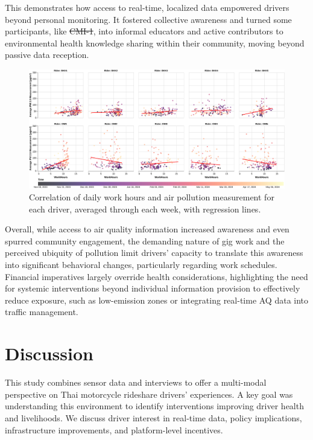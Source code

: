 \documentclass[sigconf,screen,natbib=true]{acmart}
\providecommand{\DIFadd}[1]{{\protect\color{blue}\uwave{#1}}} %
\providecommand{\DIFdel}[1]{{\protect\color{red}\sout{#1}}} %
\providecommand{\DIFaddbegin}{} %
\providecommand{\DIFaddend}{} %
\providecommand{\DIFdelbegin}{} %
\providecommand{\DIFdelend}{} %
\begin{document}
This demonstrates how access to real-time, localized data empowered drivers beyond personal monitoring.
It fostered collective awareness and turned some participants, like \DIFdelbegin \DIFdel{CMI-1}\DIFdelend \DIFaddbegin \DIFadd{CMI1}\DIFaddend , into informal educators and active contributors to environmental health knowledge sharing within their community, moving beyond passive data reception.

\begin{figure}
    \centering
    \includegraphics[width=\textwidth]{figures/work-hours-vs-aqi-per-rider-regression.pdf}
    \caption{Correlation of daily work hours and air pollution measurement for each driver, averaged through each week, with regression lines.
}
    \Description{}
    \label{fig:work-hours-vs-aqi-per-rider}
\end{figure}

Overall, while access to air quality information increased awareness and even spurred community engagement, the demanding nature of gig work and the perceived ubiquity of pollution limit drivers' capacity to translate this awareness into significant behavioral changes, particularly regarding work schedules.
Financial imperatives largely override health considerations, highlighting the need for systemic interventions beyond individual information provision to effectively reduce exposure, such as low-emission zones or integrating real-time AQ data into traffic management. %
 \section{Discussion}

This study combines sensor data and interviews to offer a multi-modal perspective on Thai motorcycle rideshare drivers' experiences.
A key goal was understanding this environment to identify interventions improving driver health and livelihoods.
We discuss driver interest in real-time data, policy implications, infrastructure improvements, and platform-level incentives.
\end{document}
